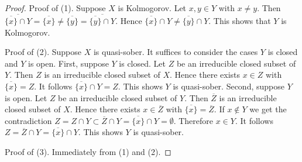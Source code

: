 \documentclass[10pt,a4paper]{amsart}
\theoremstyle{plain}
\theoremstyle{definition}
\theoremstyle{remark}
\numberwithin{equation}{subsection}
\begin{document}
\begin{proof}
Proof of (1). Suppose $X$ is Kolmogorov. Let $x,y\in Y$ with $x\neq y$. Then
$\overline{\overline{\{x\}}\cap Y}=\overline{\{x\}}\neq\overline{\{y\}}=
\overline{\overline{\{y\}}\cap Y}$. Hence
$\overline{\{x\}}\cap Y\neq\overline{\{y\}}\cap Y$. This shows that $Y$ is
Kolmogorov.

\medskip\noindent
Proof of (2). Suppose $X$ is quasi-sober. It suffices to consider the
cases $Y$ is closed and $Y$ is open. First, suppose $Y$ is closed. Let
$Z$ be an irreducible closed subset of $Y$. Then $Z$ is an irreducible closed
subset of $X$. Hence there exists $x \in Z$ with $\overline{\{x\}} = Z$. It
follows $\overline{\{x\}} \cap Y = Z$. This shows $Y$ is quasi-sober. Second,
suppose $Y$ is open. Let $Z$ be an irreducible closed subset of $Y$. Then
$\overline{Z}$ is an irreducible closed subset of $X$. Hence there
exists $x \in \overline{Z}$ with $\overline{\{x\}}=\overline{Z}$. If
$x\notin Y$ we get the contradiction
$Z=Z\cap Y\subset\overline{Z}\cap Y=\overline{\{x\}}\cap Y=\emptyset$.
Therefore $x\in Y$. It follows $Z=\overline{Z}\cap Y=\overline{\{x\}}\cap Y$.
This shows $Y$ is quasi-sober.

\medskip\noindent
Proof of (3). Immediately from (1) and (2).
\end{proof}
\end{document}
